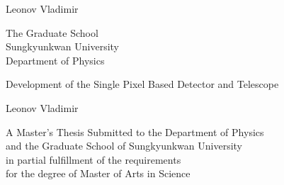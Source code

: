 \begin{titlepage}

\vspace{15em}
\thispagestyle{empty}
\begin{center}
{\fontsize{16}{16}\selectfont
Leonov Vladimir 
}
\end{center}

\vspace{12cm}




\begin{center}
{\fontsize{16}{16}\selectfont
The Graduate School \\
Sungkyunkwan University \\
Department of Physics\\
}
\end{center}




\afterpage{\blankpage}



\vspace*{1cm}
\begin{center}
{\fontsize{22}{26}\selectfont Development of the Single Pixel Based Detector and Telescope}
\end{center}


\vspace{15em}
\thispagestyle{empty}
\begin{center}
{\fontsize{16}{16}\selectfont
Leonov Vladimir 
}
\end{center}

\begin{center}
{\fontsize{14}{16}\selectfont
A Master's Thesis Submitted to the Department of Physics \\
and the Graduate School of Sungkyunkwan University \\
in partial fulfillment of the requirements \\
for the degree of Master of Arts in Science\\

\vspace{2cm}

}
\end{center}
\end{titlepage}
